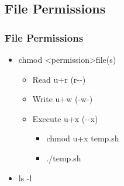 \documentclass[hyperref={pdfpagelabels=false}]{beamer}
\begin{document}
\subsection{File Permissions}
\frame
{
    \frametitle{File Permissions}
    \begin{itemize}
    \item{chmod {\textless}permission\textgreater\hspace{.5 pc}file(s)}
        \begin{itemize}
        \item{Read u+r (r\hspace{.1 pc}-\hspace{.1 pc}-)}
        \item{Write u+w (-\hspace{.1 pc}w\hspace{.1 pc}-)}
        \item{Execute u+x (-\hspace{.1 pc}-\hspace{.1 pc}x)}
            \begin{itemize}
            \item{chmod u+x temp.sh}
            \item{./temp.sh}
            \end{itemize}
        \end{itemize}
    \item{ls -l}
    \end{itemize}
}
\end{document}
